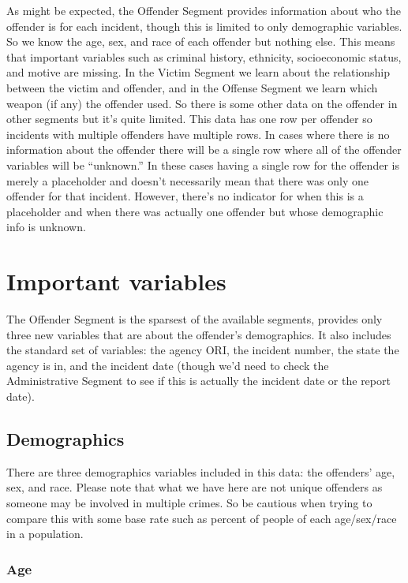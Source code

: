 \documentclass[
  12pt,
  openany]{book}
\begin{document}
As might be expected, the Offender Segment provides information about who the offender is for each incident, though this is limited to only demographic variables. So we know the age, sex, and race of each offender but nothing else. This means that important variables such as criminal history, ethnicity, socioeconomic status, and motive are missing. In the Victim Segment we learn about the relationship between the victim and offender, and in the Offense Segment we learn which weapon (if any) the offender used. So there is some other data on the offender in other segments but it's quite limited. This data has one row per offender so incidents with multiple offenders have multiple rows. In cases where there is no information about the offender there will be a single row where all of the offender variables will be ``unknown.'' In these cases having a single row for the offender is merely a placeholder and doesn't necessarily mean that there was only one offender for that incident. However, there's no indicator for when this is a placeholder and when there was actually one offender but whose demographic info is unknown.

\hypertarget{important-variables-2}{%
\section{Important variables}\label{important-variables-2}}

The Offender Segment is the sparsest of the available segments, provides only three new variables that are about the offender's demographics. It also includes the standard set of variables: the agency ORI, the incident number, the state the agency is in, and the incident date (though we'd need to check the Administrative Segment to see if this is actually the incident date or the report date).

\hypertarget{demographics}{%
\subsection{Demographics}\label{demographics}}

There are three demographics variables included in this data: the offenders' age, sex, and race. Please note that what we have here are not unique offenders as someone may be involved in multiple crimes. So be cautious when trying to compare this with some base rate such as percent of people of each age/sex/race in a population.

\hypertarget{age}{%
\subsubsection{Age}\label{age}}
\end{document}
